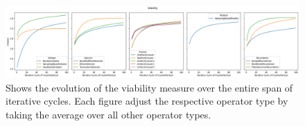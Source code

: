 
\begin{figure}[htbp]
    \centering
    \includegraphics[width=\textwidth]{figures/generated/exp1_viability.png}
    \caption{Shows the evolution of the viability measure over the entire span of iterative cycles. Each figure adjust the respective operator type by taking the average over all other operator types. }
    \label{fig:exp1-measure}
\end{figure}